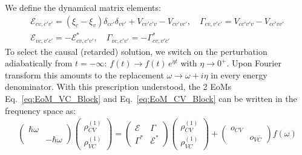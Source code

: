 \documentclass[11pt,letterpaper]{article}
\theoremstyle{definition}
\theoremstyle{plain}
\theoremstyle{remark}
\begin{document}
We define the dynamical matrix elements:
\begin{gather}
    \mathcal{E}_{cv, c'v'} = (\xi_c - \xi_v)\delta_{cc'}\delta_{vv'} + V_{cv'c'v} - V_{cv'vc'}, \quad \Gamma_{cv, v'c'} = V_{cc'v'v} - V_{cc'vv'} \\
    \mathcal{E}_{vc, v'c'} = - \mathcal{E}^*_{cv, c'v'}, \quad \Gamma_{vc, c'v'} = -\Gamma^*_{cv, v'c'}
\end{gather}
To select the causal (retarded) solution, we switch on the perturbation adiabatically from $t=-\infty$: $f(t)\to f(t)\,e^{\eta t}$ with $\eta\to 0^+$. Upon Fourier transform this amounts to the replacement $\omega\to\omega+i\eta$ in every energy denominator.  With this prescription understood, the 2 EoMs Eq.~\eqref{eq:EoM_VC_Block} and Eq.~\eqref{eq:EoM_CV_Block} can be written in the frequency space as:
\begin{gather}
    \begin{pmatrix}
        \hbar \omega & \\
        & -\hbar \omega
    \end{pmatrix}
    \begin{pmatrix}
        \rho^{(1)}_{CV} \\ \rho^{(1)}_{VC}
    \end{pmatrix} = 
    \begin{pmatrix}
        \mathcal{E} & \Gamma \\
        \Gamma^* & \mathcal{E}^*
    \end{pmatrix}
    \begin{pmatrix}
        \rho^{(1)}_{CV} \\ \rho^{(1)}_{VC}
    \end{pmatrix} + 
    \begin{pmatrix}
        o_{CV} & \\ & o_{VC}
    \end{pmatrix} f(\omega) \label{eq:EoM_complete}
\end{gather}
\end{document}
